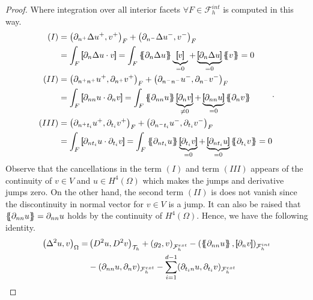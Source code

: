 \begin{proof}
Where integration over all interior facets $ \forall F \in \mathcal{F}_{h}^{int}$ is computed in this way.
\begin{equation*}
    \begin{split}
        (I) &  =    \left(\partial _{n^{+}} \Delta  u^{+} ,v^{+}\right)_{F} +
        \left(\partial _{n^{-}} \Delta  u^{-} ,v^{-}\right)_{F}  \\
            & =   \int_{F}^{}
            \jump{ \partial _{n} \Delta  u \cdot v } =
            \int_{F}^{}
            \mean{ \partial _{n} \Delta  u } \underbrace{\jump{ v }}_{= 0}    + \underbrace{\jump{ \partial _{n} \Delta  u
            }}_{= 0}    \mean{ v } = 0 \\
            (II) &  =     \left(\partial _{n^{+}n^{+}} u^{+}, \partial_{n^{+}} v^{+} \right)_{F} +  \left(\partial _{n^{-}n^{-}} u^{-}, \partial_{n^{-}} v^{-} \right)_{F}    \\
                 &= \int_{F}^{} \jump{ \partial _{nn} u \cdot  \partial_{n} v }   = \int_{F}^{}
                       \mean{ \partial _{nn} u    } \underbrace{\jump{ \partial_{n} v }  }_{\neq 0}    + \underbrace{\jump{ \partial
                               _{nn}  u
                       }}_{= 0}    \mean{ \partial _{n}v } \\
            (III) &  =     \left(\partial _{n^{+}t_{i}} u^{+}, \partial_{t_{i}} v^{+}
                \right)_{F} +  \left(\partial _{n^{-}t_{i}} u^{-}, \partial_{t_{i}} v^{-}
                \right)_{F}   \\
                 &  =   \int_{F}^{}
                 \jump{ \partial _{nt_{i}} u \cdot  \partial_{t_{i}} v } =
                 \int_{F}^{}
                 \mean{ \partial _{nt_{i}} u    } \underbrace{\jump{ \partial_{t_{i}} v }  }_{= 0}    + \underbrace{\jump{ \partial
                         _{nt_{i}}  u
                 }}_{= 0}    \mean{ \partial _{t_{i}}v }  = 0
                   \end{split}
.\end{equation*}
Observe that the cancellations in the term $(I)$ and term $(III)$  appears of the continuity of $v\in V $ and $u\in H^{4}( \Omega ) $ which makes the jumps and derivative jumps zero. On the other hand, the second term $(II)$  is does not vanish since the discontinuity in normal vector for $v \in V$ is a jump. It can also be raised that $\left\{\!\!\left\{
\partial _{nn} u \right\}\!\!\right\} = \partial _{nn} u  $ holds by the continuity of $H^{4}( \Omega  ) $.
Hence, we have the following identity.
\begin{equation}
\label{eq:bi_basic_dg_full_1}
\begin{split}
    \left( \Delta  ^{2} u, v \right) _{\Omega }  =&   \left( D^2u, D^2v \right)_{\mathcal{T} _{h}} +  \left(g_{2}, v  \right) _{\mathcal{F}^{ext}_{h} }  -  ( \mean{ \partial _{nn} u }   , \jump{ \partial_{n} v } )_{\mathcal{F}_{h}^{int} } \\
                                                  &  - ( \partial _{nn} u , \partial _{n} v)_{\mathcal{F}^{ext}_{h} } - \sum_{i =1  }^{d-1} ( \partial   _{t_{i}n} u  ,  \partial   _{t_{i}}  v  )_{ \mathcal{F}^{ext} _{h}  }
\end{split}
\end{equation}


\end{proof}
